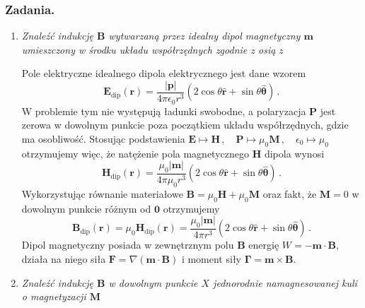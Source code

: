\documentclass[../main.tex]{subfiles}
\begin{document}
\subsubsection*{Zadania.}
\begin{enumerate}
    \item \textit{Znaleźć indukcję \(\mathbf{B}\) wytwarzaną przez idealny dipol magnetyczny
    \(\mathbf{m}\) umieszczony w środku układu współrzędnych zgodnie z osią \(z\)}
    \medskip
    
    Pole elektryczne idealnego dipola elektrycznego jest dane wzorem
    \begin{equation*}
        \mathbf{E}_\text{dip}(\mathbf{r})=\frac{|\mathbf{p}|}{4\pi\epsilon_0r^3}(2\cos\theta\mathbf{\hat{r}}+\sin\theta\boldsymbol{\hat{\theta}})\,.
    \end{equation*}
    W problemie tym nie występują ładunki swobodne, a polaryzacja \(\mathbf{P}\) jest zerowa w
    dowolnym punkcie poza początkiem układu współrzędnych, gdzie ma osobliwość. Stosując
    podstawienia \(\mathbf{E}\mapsto\mathbf{H}\,,\quad
    \mathbf{P}\mapsto\mu_0\mathbf{M}\,,\quad\epsilon_0\mapsto\mu_0\) otrzymujemy więc, że natężenie
    pola magnetycznego \(\mathbf{H}\) dipola wynosi
    \begin{equation*}
        \mathbf{H}_\text{dip}(\mathbf{r})=\frac{\mu_0|\mathbf{m}|}{4\pi\mu_0r^3}(2\cos\theta\mathbf{\hat{r}}+\sin\theta\boldsymbol{\hat{\theta}})\,.
    \end{equation*}
    Wykorzystując równanie materiałowe \(\mathbf{B}=\mu_0\mathbf{H}+\mu_0\mathbf{M}\) oraz fakt, że
    \(\mathbf{M}=0\) w dowolnym punkcie różnym od \(\mathbf{0}\) otrzymujemy
    \begin{equation*}
        \mathbf{B}_\text{dip}(\mathbf{r})=\mu_0\mathbf{H}_\text{dip}(\mathbf{r})=\frac{\mu_0|\mathbf{m}|}{4\pi r^3}(2\cos\theta\mathbf{\hat{r}}+\sin\theta\boldsymbol{\hat{\theta}})\,.
    \end{equation*}
    Dipol magnetyczny posiada w zewnętrznym polu \(\mathbf{B}\) energię
    \(W=-\mathbf{m}\cdot\mathbf{B}\), działa na niego siła
    \(\mathbf{F}=\nabla(\mathbf{m}\cdot\mathbf{B})\) i moment siły
    \(\boldsymbol{\Gamma}=\mathbf{m}\times\mathbf{B}\).
    \item \textit{Znaleźć indukcję \(\mathbf{B}\) w dowolnym punkcie \(X\) jednorodnie
    namagnesowanej kuli o magnetyzacji \(\mathbf{M}\)}
    \medskip
    

\end{enumerate}
\end{document}
